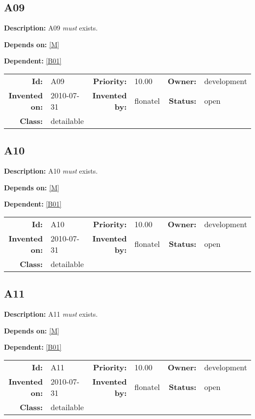 \subsection{A09}\label{A09}
\textbf{Description:} A09 \textsl{must} exists.

\textbf{Depends on:} \ref{M} 

\textbf{Dependent:} \ref{B01} 

\par
{\small \begin{center}\begin{tabular}{rlrlrl}
\textbf{Id:} & A09  & \textbf{Priority:} & 10.00  & \textbf{Owner:} & development\\ 
\textbf{Invented on:} & 2010-07-31  & \textbf{Invented by:} & flonatel  & \textbf{Status:} & open \\ 
\textbf{Class:} & detailable  & & & \end{tabular}\end{center} }
\subsection{A10}\label{A10}
\textbf{Description:} A10 \textsl{must} exists.

\textbf{Depends on:} \ref{M} 

\textbf{Dependent:} \ref{B01} 

\par
{\small \begin{center}\begin{tabular}{rlrlrl}
\textbf{Id:} & A10  & \textbf{Priority:} & 10.00  & \textbf{Owner:} & development\\ 
\textbf{Invented on:} & 2010-07-31  & \textbf{Invented by:} & flonatel  & \textbf{Status:} & open \\ 
\textbf{Class:} & detailable  & & & \end{tabular}\end{center} }
\subsection{A11}\label{A11}
\textbf{Description:} A11 \textsl{must} exists.

\textbf{Depends on:} \ref{M} 

\textbf{Dependent:} \ref{B01} 

\par
{\small \begin{center}\begin{tabular}{rlrlrl}
\textbf{Id:} & A11  & \textbf{Priority:} & 10.00  & \textbf{Owner:} & development\\ 
\textbf{Invented on:} & 2010-07-31  & \textbf{Invented by:} & flonatel  & \textbf{Status:} & open \\ 
\textbf{Class:} & detailable  & & & \end{tabular}\end{center} }
